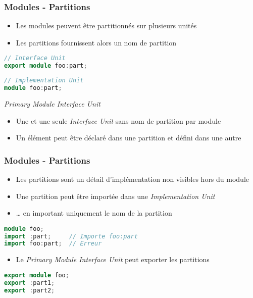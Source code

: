 \documentclass[C++.tex]{subfiles}
\begin{document}
\begin{frame}[fragile]
	\frametitle{Modules - Partitions}
	\begin{itemize}
		\item Les modules peuvent être partitionnés sur plusieurs unités
		\item Les partitions fournissent alors un nom de partition
	\end{itemize}

	\begin{lstlisting}[language=C++]
// Interface Unit
export module foo:part;\end{lstlisting}

	\begin{lstlisting}[language=C++]
// Implementation Unit
module foo:part;\end{lstlisting}

	\begin{alertblock}{\textit{Primary Module Interface Unit}}
		\begin{itemize}
			\item Une et une seule \textit{Interface Unit} sans nom de partition par module
		\end{itemize}
	\end{alertblock}

	\begin{itemize}
		\item Un élément peut être déclaré dans une partition et défini dans une autre
	\end{itemize}
\end{frame}

\begin{frame}[fragile]
	\frametitle{Modules - Partitions}
	\begin{itemize}
		\item Les partitions sont un détail d'implémentation non visibles hors du module


		\item Une partition peut être importée dans une \textit{Implementation Unit}
		\item \ldots{} en important uniquement le nom de la partition
	\end{itemize}

	\begin{lstlisting}[language=C++]
module foo;
import :part;     // Importe foo:part
import foo:part;  // Erreur\end{lstlisting}

	\begin{itemize}
		\item Le \textit{Primary Module Interface Unit} peut exporter les partitions
	\end{itemize}

	\begin{lstlisting}[language=C++]
export module foo;
export :part1;
export :part2;\end{lstlisting}
\end{frame}
\end{document}
